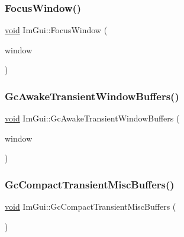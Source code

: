 \mbox{\label{namespaceImGui_ade4c08e7e7ad7bbfa4835248f5f3a7c6}} 
\subsubsection{\texorpdfstring{Focus\+Window()}{FocusWindow()}}
{\footnotesize\ttfamily \hyperlink{imgui__impl__opengl3__loader_8h_ac668e7cffd9e2e9cfee428b9b2f34fa7}{void} Im\+Gui\+::\+Focus\+Window (\begin{DoxyParamCaption}\item[{\hyperlink{structImGuiWindow}{Im\+Gui\+Window} $\ast$}]{window }\end{DoxyParamCaption})}

\mbox{\label{namespaceImGui_ad70feca33961fb47a8074074a8da2f80}} 
\subsubsection{\texorpdfstring{Gc\+Awake\+Transient\+Window\+Buffers()}{GcAwakeTransientWindowBuffers()}}
{\footnotesize\ttfamily \hyperlink{imgui__impl__opengl3__loader_8h_ac668e7cffd9e2e9cfee428b9b2f34fa7}{void} Im\+Gui\+::\+Gc\+Awake\+Transient\+Window\+Buffers (\begin{DoxyParamCaption}\item[{\hyperlink{structImGuiWindow}{Im\+Gui\+Window} $\ast$}]{window }\end{DoxyParamCaption})}

\mbox{\label{namespaceImGui_aab0d052a1581fddc1cc2d9d981f487c0}} 
\subsubsection{\texorpdfstring{Gc\+Compact\+Transient\+Misc\+Buffers()}{GcCompactTransientMiscBuffers()}}
{\footnotesize\ttfamily \hyperlink{imgui__impl__opengl3__loader_8h_ac668e7cffd9e2e9cfee428b9b2f34fa7}{void} Im\+Gui\+::\+Gc\+Compact\+Transient\+Misc\+Buffers (\begin{DoxyParamCaption}{ }\end{DoxyParamCaption})}

